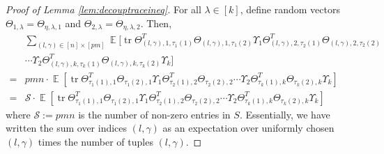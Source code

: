 \documentclass[11pt]{amsart}
\numberwithin{equation}{section}
\numberwithin{equation}{section}
\DeclareMathOperator{\E}{\mathbb{E}}
\DeclareMathOperator*{\tr}{tr}
\newcommand{\cS}{\mathcal{S}}
\theoremstyle{remark}
\theoremstyle{definition}
\begin{document}
\begin{proof}[Proof of Lemma \ref{lem:decouptraceineq}]
For all $\lambda \in [k]$, define random vectors $\Theta_{1, \lambda} = \Theta_{\eta, \lambda, 1}$ and $\Theta_{2, \lambda} = \Theta_{\eta, \lambda, 2}$. Then,
\begin{align*}
        &\sum_{(l,\gamma) \in [n] \times [pm]} \E[ \tr \Theta_{(l,\gamma), 1, \tau_1(1)}^T\Theta_{(l,\gamma), 1, \tau_1(2)}
	\Upsilon_1\Theta_{(l,\gamma), 2, \tau_2(1)}^T\Theta_{(l,\gamma), 2, \tau_2(2)}\\ &\cdots
	\Upsilon_2\Theta_{(l,\gamma), k, \tau_k(1)}^T\Theta_{(l,\gamma), k, \tau_k(2)}\Upsilon_k] \\ =&
    pmn \cdot \E[
	\tr \Theta_{\tau_{1}(1),1}^T\Theta_{\tau_{1}(2),1}
	\Upsilon_1\Theta_{\tau_{2}(1),2}^T\Theta_{\tau_{2}(2),2}\cdots
	\Upsilon_2\Theta_{\tau_{k}(1),k}^T\Theta_{\tau_{k}(2),k}\Upsilon_k] \\ =&
    \cS \cdot \E[
	\tr \Theta_{\tau_{1}(1),1}^T\Theta_{\tau_{1}(2),1}
	\Upsilon_1\Theta_{\tau_{2}(1),2}^T\Theta_{\tau_{2}(2),2}\cdots
	\Upsilon_2\Theta_{\tau_{k}(1),k}^T\Theta_{\tau_{k}(2),k}\Upsilon_k]
\end{align*}
    where $\cS := pmn$ is the number of non-zero entries in $S$.
    Essentially, we have written the sum over indices $(l, \gamma)$ as an expectation over uniformly chosen $(l, \gamma)$ times the number of tuples $(l, \gamma)$.

    



\end{proof}
\end{document}
